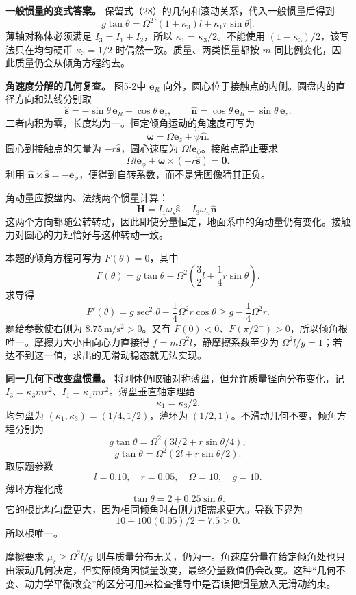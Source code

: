 \documentclass[12pt,a4paper,UTF8]{ctexart}
\begin{document}
\textbf{一般惯量的变式答案。}
保留式（28）的几何和滚动关系，代入一般惯量后得到 \[
g\tan\theta=\Omega^2\big[(1+\kappa_3)l+\kappa_1r\sin\theta\big].
\] 薄轴对称体必须满足 \(I_3=I_1+I_2\)，所以
\(\kappa_1=\kappa_3/2\)。不能使用 \((1-\kappa_3)/2\)，该写法只在均匀硬币
\(\kappa_3=1/2\) 时偶然一致。质量、两类惯量都按 \(m\)
同比例变化，因此质量仍会从倾角方程约去。

\textbf{角速度分解的几何复查。} 图5-2中 \(\bm e_R\)
向外，圆心位于接触点的内侧。圆盘内的直径方向和法线分别取 \[
\hat{\bm s}=-\sin\theta\,\bm e_R+\cos\theta\,\bm e_z,
\qquad
\hat{\bm n}=\cos\theta\,\bm e_R+\sin\theta\,\bm e_z.
\] 二者内积为零，长度均为一。恒定倾角运动的角速度可写为 \[
\bm\omega=\Omega\bm e_z+\dot\psi\hat{\bm n}.
\] 圆心到接触点的矢量为 \(-r\hat{\bm s}\)，圆心速度为
\(\Omega l\bm e_\phi\)。接触点静止要求 \[
\Omega l\bm e_\phi+\bm\omega\times(-r\hat{\bm s})=\bm0.
\] 利用
\(\hat{\bm n}\times\hat{\bm s}=-\bm e_\phi\)，便得到自转系数，而不是凭图像猜其正负。

角动量应按盘内、法线两个惯量计算： \[
\bm H=I_1\omega_s\hat{\bm s}+I_3\omega_n\hat{\bm n}.
\]
这两个方向都随公转转动，因此即使分量恒定，地面系中的角动量仍有变化。接触力对圆心的力矩恰好与这种转动一致。

本题的倾角方程可写为 \(F(\theta)=0\)，其中 \[
F(\theta)=g\tan\theta-\Omega^2\left(\frac32l+\frac14r\sin\theta\right).
\] 求导得 \[
F'(\theta)=g\sec^2\theta-\frac14\Omega^2r\cos\theta
\ge g-\frac14\Omega^2r.
\] 题给参数使右侧为 \(8.75\,\mathrm{m/s^2}>0\)。又有
\(F(0)<0\)、\(F(\pi/2^-)>0\)，所以倾角根唯一。摩擦力大小由向心力直接得
\(f=m\Omega^2l\)，静摩擦系数至少为
\(\Omega^2l/g=1\)；若达不到这一值，求出的无滑动稳态就无法实现。

\textbf{同一几何下改变盘惯量。}
将刚体仍取轴对称薄盘，但允许质量径向分布变化，记
\(I_3=\kappa_3mr^2\)、\(I_1=\kappa_1mr^2\)。薄盘垂直轴定理给 \[
\kappa_1=\kappa_3/2.
\] 均匀盘为 \((\kappa_1,\kappa_3)=(1/4,1/2)\)，薄环为
\((1/2,1)\)。不滑动几何不变，倾角方程分别为 \[
g\tan\theta=\Omega^2(3l/2+r\sin\theta/4),
\] \[
g\tan\theta=\Omega^2(2l+r\sin\theta/2).
\] 取原题参数 \[
l=0.10,\quad r=0.05,\quad\Omega=10,\quad g=10.
\] 薄环方程化成 \[
\tan\theta=2+0.25\sin\theta.
\] 它的根比均匀盘更大，因为相同倾角时右侧力矩需求更大。导数下界为 \[
10-100(0.05)/2=7.5>0.
\] 所以根唯一。

摩擦要求 \(\mu_s\ge\Omega^2l/g\)
则与质量分布无关，仍为一。角速度分量在给定倾角处也只由滚动几何决定，但实际倾角因惯量改变，最终分量数值仍会改变。这种``几何不变、动力学平衡改变''的区分可用来检查推导中是否误把惯量放入无滑动约束。
\end{document}
